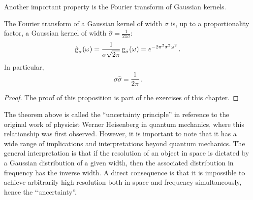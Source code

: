 Another important property is the Fourier transform of Gaussian kernels.
\begin{theorem}
  \label{thm:gauss-uncertainty}
  The Fourier transform of a Gaussian kernel of width $\sigma$ is, up to a proportionality
  factor, a Gaussian kernel of width $\hat{\sigma}=\frac{1}{2\pi\sigma}$:
  \begin{equation}
    \hat{\operatorname{g}}_{\sigma}(\omega)=
    \frac{1}{\sigma\sqrt{2\pi}}\operatorname{g}_{\hat{\sigma}}(\omega)
    =e^{-2\pi^2\sigma^2\omega^2}\,.
  \end{equation}
  In particular,
  \begin{equation}
    \sigma\hat{\sigma}=\frac{1}{2\pi}\,.\label{eq:gauss-uncertainty}
  \end{equation}
\end{theorem}
\begin{proof}
  The proof of this proposition is part of the exercises of this chapter.
\end{proof}
The theorem above is called the ``uncertainty principle'' in reference to the original
work of physicist Werner Heisenberg in quantum mechanics, where this relationship was
first observed. However, it is important to note that it has a wide range of implications
and interpretations beyond quantum mechanics. The general interpretation is that if the
resolution of an object in space is dictated by a Gaussian distribution of a given width,
then the associated distribution in frequency has the inverse width. A direct consequence
is that it is impossible to achieve arbitrarily high resolution both in space and
frequency simultaneously, hence the ``uncertainty''.
